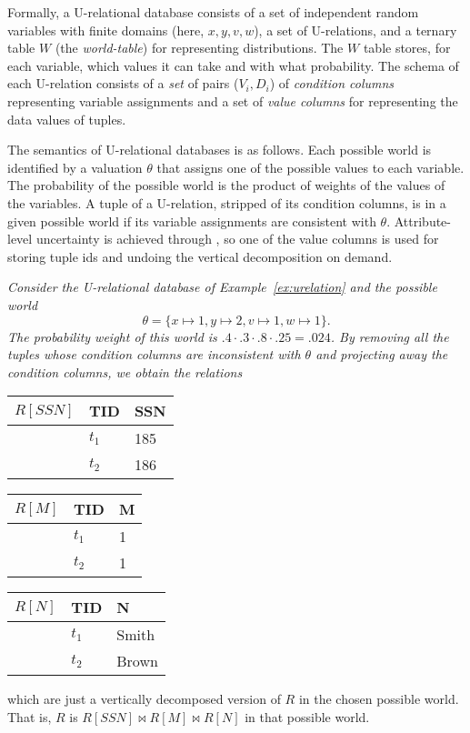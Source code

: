 Formally, a U-relational database consists of a
set of independent random variables with finite domains (here, $x,y,v,w$),
a set of U-relations, and a ternary table $W$ (the {\em world-table}\/) for representing distributions. The $W$ table stores, for each variable, which values it can take and with what probability.
%
The schema of each U-relation consists of
a {\em set}\/ of pairs ($V_i, D_i$) of {\em condition columns}\/ representing variable assignments and a set of {\em value columns}\/ for representing the data values of tuples.

The semantics of U-relational databases is as follows.
Each possible world is identified by a valuation $\theta$ that assigns one
of the possible values to each variable.
The probability of the possible world is the product of weights of the
values of the variables.
A tuple of a U-relation, stripped of its condition columns, is in a given possible
world if its variable assignments are consistent with $\theta$.
Attribute-level uncertainty is achieved through , so one of the value columns is used for storing tuple ids and undoing the vertical decomposition on demand.


\begin{example}\em
Consider the U-relational database of Example~\ref{ex:urelation} and
the possible world
\[
\theta = \{ x \mapsto 1, y \mapsto 2, v \mapsto 1, w \mapsto 1 \}.
\]
The probability weight of this world is $.4 \cdot .3 \cdot .8 \cdot .25 = .024$. By removing all the tuples
whose condition columns are inconsistent with $\theta$ and projecting away the condition columns,
we obtain the relations
\begin{center}
\begin{tabular}{l|l|l}
\hline
$R[SSN]$ & TID & SSN \\
\hline
& $t_1$ & 185 \\
& $t_2$ & 186 \\
\end{tabular}
%
\hspace{3mm}
%
\begin{tabular}{l|l|l}
\hline
$R[M]$ & TID & M \\
\hline
& $t_1$ & 1 \\
& $t_2$ & 1 \\
\end{tabular}
%
\hspace{3mm}
%
\begin{tabular}{l|l|l}
\hline
$R[N]$ & TID & N \\
\hline
      & $t_1$ & Smith \\
      & $t_2$ & Brown \\
\end{tabular}
\end{center}
which are just a vertically decomposed version of $R$ in the chosen possible world.
That is, $R$ is $R[SSN] \bowtie R[M] \bowtie R[N]$ in that possible world.
\punto
\end{example}


